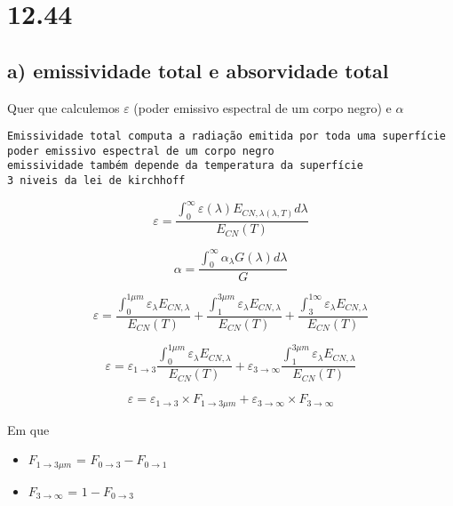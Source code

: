 \section{12.44}



\subsection{a) emissividade total e absorvidade total}

Quer que calculemos $\varepsilon$ (poder emissivo espectral de um corpo negro) e $\alpha$


\begin{verbatim}
Emissividade total computa a radiação emitida por toda uma superfície
poder emissivo espectral de um corpo negro
emissividade também depende da temperatura da superfície
3 niveis da lei de kirchhoff
\end{verbatim}

\[\varepsilon = \frac{\int _{0} ^{\infty} {\varepsilon(\lambda)E_{CN,\lambda(\lambda ,T)}}d\lambda}{E_{CN}(T)}\]

\[\alpha = \frac{\int _{0}^{\infty}\alpha _{\lambda}G(\lambda)d\lambda }{G}\]

\[
\varepsilon = \frac{\int _{0}^{1\mu m}\varepsilon _{\lambda}E_{CN,\lambda}}{E_{CN}(T)} + \frac{\int _{1}^{3\mu m}\varepsilon _{\lambda}E_{CN,\lambda}}{E_{CN}(T)} + \frac{\int _{3}^{1\infty}\varepsilon _{\lambda}E_{CN,\lambda}}{E_{CN}(T)}
\]

\[
\varepsilon = \varepsilon _{1 \rightarrow 3} \frac{\int _{0}^{1\mu m}\varepsilon _{\lambda}E_{CN,\lambda}}{E_{CN}(T)} +  \varepsilon _{3 \rightarrow \infty} \frac{\int _{1}^{3\mu m}\varepsilon _{\lambda}E_{CN,\lambda}}{E_{CN}(T)} 
\]

\[
\varepsilon = \varepsilon _{1 \rightarrow 3} \times F_{1 \rightarrow 3\mu m} +  \varepsilon _{3 \rightarrow \infty} \times F_{3 \rightarrow  \infty}
\]

Em que

\begin{itemize}
\item $ F_{1 \rightarrow 3\mu m}$ = $F_{0 \rightarrow 3} - F_{0 \rightarrow 1}$
\item $ F_{3 \rightarrow \infty}$ = $1 - F_{0 \rightarrow 3}$
\end{itemize}


